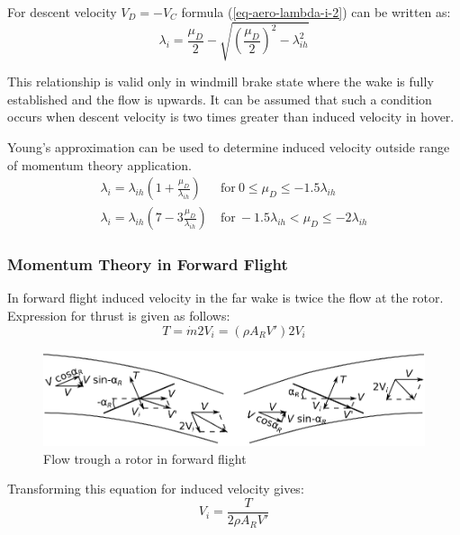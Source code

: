 For descent velocity $V_D = - V_C$ formula (\ref{eq-aero-lambda-i-2}) can be written as:
\begin{equation}
  \lambda_i
  =
  \frac{\mu_D}{2}
  -
  \sqrt{ \left( \frac{\mu_D}{2} \right)^2 - \lambda_{ih}^2 }
\end{equation}

This relationship is valid only in windmill brake state where the wake is fully established and the flow is upwards. \cite{Padfield2007} It can be assumed that such a condition occurs when descent velocity is two times greater than induced velocity in hover. \cite{Stepniewski1984}

Young’s approximation can be used to determine induced velocity outside range of momentum theory application. \cite{Padfield2007}
\begin{align}
  \lambda_i
  =
  \lambda_{ih} \left( 1 + \frac{\mu_D}{\lambda_{ih}} \right)
  &\mathrm{~for~} 0 \leq \mu_D \leq -1.5 \lambda_{ih} \\
  \lambda_i
  =
  \lambda_{ih} \left( 7 - 3 \frac{\mu_D}{\lambda_{ih}} \right)
  &\mathrm{~for~} -1.5 \lambda_{ih} < \mu_D \leq -2 \lambda_{ih}
\end{align}

\subsubsection{Momentum Theory in Forward Flight}

In forward flight induced velocity in the far wake is twice the flow at the rotor. \cite{Padfield2007} Expression for thrust is given as follows:
\begin{equation}
  T = \dot m 2 V_i = \left( \rho A_R V' \right) 2 V_i
\end{equation}

\begin{figure}
  \centering
  \includegraphics[width=120mm]{images/momentum_theory_forward.eps}
  \caption{Flow trough a rotor in forward flight}
\end{figure}

Transforming this equation for induced velocity gives:
\begin{equation}
  \label{eq-aero-lambda-i-3}
  V_i = \frac{T}{ 2 \rho A_R V' }
\end{equation}

